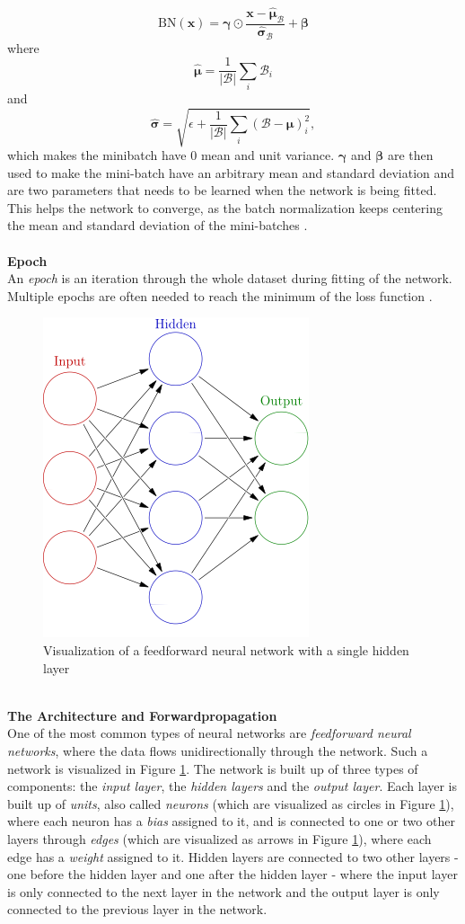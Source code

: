\documentclass[./main.tex]{subfiles}
\begin{document}
$$\text{BN}(\bm{x}) = \bm{\gamma} \odot \frac{\bm{x} - \hat{\bm{\mu}}_{\mathcal{B}}}{\hat{\bm{\sigma}}_{\mathcal{B}}} + \bm{\beta}$$
where
$$\hat{\bm{\mu}} = \frac{1}{|\mathcal{B}|} \sum_{i} \mathcal{B}_i$$
and
$$\hat{\bm{\sigma}} = \sqrt{\epsilon + \frac{1}{|\mathcal{B}|} \sum_{i} \left(\mathcal{B} - \bm{\mu} \right)_i ^2 },$$
which makes the minibatch have $0$ mean and unit variance. $\bm{\gamma}$ and $\bm{\beta}$ are then used to make the mini-batch have an arbitrary mean and standard deviation and are two parameters that needs to be learned when the network is being fitted. This helps the network to converge, as the batch normalization keeps centering the mean and standard deviation of the mini-batches \cite{d2l}.
\\
\\
\textbf{Epoch} \\
An \textit{epoch} is an iteration through the whole dataset during fitting of the network. Multiple epochs are often needed to reach the minimum of the loss function \cite{d2l}.
\\
\begin{figure}[htbp]
    \centering
    \includegraphics[height = 5 cm]{entities/feed_forward_nn.jpg}
    \caption{Visualization of a feedforward neural network with a single hidden layer \cite{feedforward_nn}}
    \label{feedforward_nn}
\end{figure}
\\
\noindent \textbf{The Architecture and Forwardpropagation} \\
One of the most common types of neural networks are \textit{feedforward neural networks}, where the data flows unidirectionally through the network. Such a network is visualized in Figure \ref{feedforward_nn}. The network is built up of three types of components: the \textit{input layer}, the \textit{hidden layers} and the \textit{output layer}. Each layer is built up of \textit{units}, also called \textit{neurons} (which are visualized as circles in Figure \ref{feedforward_nn}), where each neuron has a \textit{bias} assigned to it, and is connected to one or two other layers through \textit{edges} (which are visualized as arrows in Figure \ref{feedforward_nn}), where each edge has a \textit{weight} assigned to it. Hidden layers are connected to two other layers - one before the hidden layer and one after the hidden layer - where the input layer is only connected to the next layer in the network and the output layer is only connected to the previous layer in the network. \\
\end{document}
